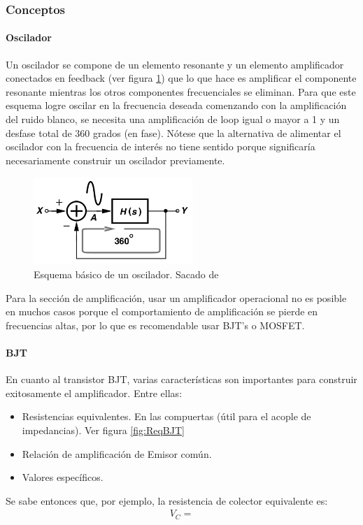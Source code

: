 \subsubsection{Conceptos}\label{sec:0z0z2Conceptos}

\paragraph{Oscilador}
Un oscilador se compone de un elemento resonante y un elemento amplificador conectados en feedback (ver figura \ref{fig:basicOscilator}) que lo que hace es amplificar el componente resonante mientras los otros componentes frecuenciales se eliminan. Para que este esquema logre oscilar en la frecuencia deseada comenzando con la amplificación del ruido blanco, se necesita una amplificación de loop igual o mayor a 1 y un desfase total de 360 grados (en fase). Nótese que la alternativa de alimentar el oscilador con la frecuencia de interés no tiene sentido porque significaría necesariamente construir un oscilador previamente.

\begin{figure}[H]
    \centering
    \includegraphics[width=6cm]{Images/1.png}
    \caption{Esquema básico de un oscilador. Sacado de \cite{razavi}}
    \label{fig:basicOscilator}
\end{figure}

Para la sección de amplificación, usar un amplificador operacional no es posible en muchos casos porque el comportamiento de amplificación se pierde en frecuencias altas, por lo que es recomendable usar BJT's o MOSFET. 


\paragraph{BJT}
En cuanto al transistor BJT, varias características son importantes para construir exitosamente el amplificador. Entre ellas:
\begin{itemize}
    \item Resistencias equivalentes. En las compuertas (útil para el acople de impedancias). Ver figura \ref{fig:ReqBJT}
    \item Relación de amplificación de Emisor común. 
    \item Valores específicos. 
\end{itemize}
Se sabe entonces que, por ejemplo, la resistencia de colector equivalente es: 
\begin{align}
    V_C=
\end{align}

